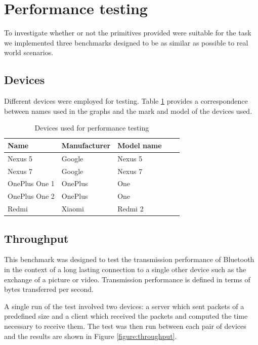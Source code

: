 \section{Performance testing}
To investigate whether or not the primitives provided were suitable for the task we implemented three benchmarks designed to be as similar as possible to real world scenarios.


\subsection{Devices}
Different devices were employed for testing. Table \ref{table:devices-used} provides a correspondence between names used in the graphs and the mark and model of the devices 
used.

\begin{table}[h]
\centering
\caption{Devices used for performance testing}
\label{table:devices-used}
\begin{tabular}{lllll}
\hline
Name          & Manufacturer      & Model name    \\ \hline
Nexus 5       & Google            & Nexus 5       \\
Nexus 7       & Google            & Nexus 7       \\
OnePlus One 1 & OnePlus           & One           \\
OnePlus One 2 & OnePlus           & One           \\
Redmi         & Xiaomi            & Redmi 2       \\ 
\hline
\end{tabular}
\end{table}

\subsection{Throughput}
This benchmark was designed to test the transmission performance of Bluetooth in the context of a long lasting connection to a single other device such as the exchange of a picture or video.
Transmission performance is defined in terms of bytes transferred per second.

A single run of the test involved two devices: a server which sent packets of a predefined size and a client which received the packets and computed the time necessary to receive them.
The test was then run between each pair of devices and the results are shown in Figure \ref{figure:throughput}.

